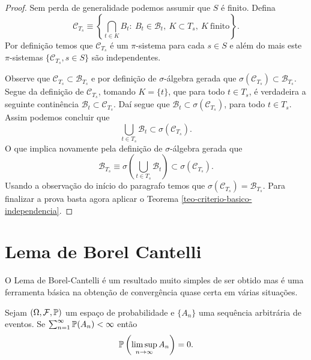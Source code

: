 \begin{proof}
Sem perda de generalidade podemos assumir que $S$ é finito. 
Defina 
	\[
		\mathcal{C}_{T_s}
		\equiv
		\left\{
			\bigcap_{t\in K} B_{t}:\
			B_{t}\in\mathscr{B}_{t},\
			K\subset T_s,\
			K\ \text{finito}
		\right\}.
	\]
Por definição temos que $\mathcal{C}_{T_s}$ é um 
$\pi$-sistema para cada $s\in S$ e além do mais 
este $\pi$-sistemas $\{ \mathcal{C}_{T_s}, s\in S\}$ são independentes.

Observe que $\mathcal{C}_{T_s}\subset \mathscr{B}_{T_s}$ 
e por definição de $\sigma$-álgebra gerada que 
$\sigma(\mathcal{C}_{T_s})\subset \mathscr{B}_{T_s}$.
Segue da definição de $\mathcal{C}_{T_s}$, 
tomando $K=\{t\}$, que
para todo $t\in T_s$, é verdadeira a seguinte continência
$\mathscr{B}_{t}\subset \mathcal{C}_{T_s}$. 
Daí segue que $\mathscr{B}_{t}\subset \sigma(\mathcal{C}_{T_s})$,
para todo $t\in T_s$. 
Assim podemos concluir que 
	\[
		\bigcup_{t\in T_s}\mathscr{B}_{t}
		\subset
		\sigma(\mathcal{C}_{T_s}).
	\]
O que implica novamente pela definição de $\sigma$-álgebra
gerada que
	\[
		\mathscr{B}_{T_s}
		\equiv
		\sigma
		\left(
			\bigcup_{t\in T_s}\mathscr{B}_{t}
		\right)		
		\subset
		\sigma(\mathcal{C}_{T_s}).
	\]
Usando a observação do início do paragrafo temos que 
$\sigma(\mathcal{C}_{T_s}) = \mathscr{B}_{T_s}$. Para finalizar 
a prova basta agora aplicar o 
Teorema \ref{teo-criterio-basico-independencia}.
\end{proof}











\section{Lema de Borel Cantelli}

O Lema de Borel-Cantelli é um resultado muito simples 
de ser obtido mas é uma ferramenta básica na obtenção de 
convergência quase certa em várias situações.

\begin{lema}[Lema de Borel-Cantelli]
Sejam $(\Omega,\F,\P)$ um espaço de probabilidade 
e $\{A_n\}$ uma sequência arbitrária de eventos.
Se $\sum_{n=1}^{\infty} \P(A_n)<\infty$ então 
	\[
		\P\left(\limsup_{n\to\infty} A_n\right)=0.
	\]
\end{lema}